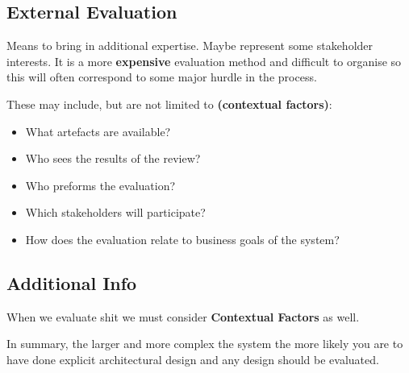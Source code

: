 \documentclass[a4paper]{article}
\begin{document}
\subsection{External Evaluation}
Means to bring in additional expertise. Maybe represent some stakeholder interests. It is a more \textbf{expensive} evaluation method and difficult to organise so this will often correspond to some major hurdle in the process.


These may include, but are not limited to \textbf{(contextual factors)}:
\begin{itemize}
\item What artefacts are available?
\item Who sees the results of the review?
\item Who preforms the evaluation?
\item Which stakeholders will participate?
\item How does the evaluation relate to business goals of the system?
\end{itemize}


\subsection{Additional Info}

When we evaluate shit we must consider \textbf{Contextual Factors} as well.

In summary, the	larger and	more complex the system the more likely you are to have done explicit architectural design and any design should be evaluated.
 
\end{document}
